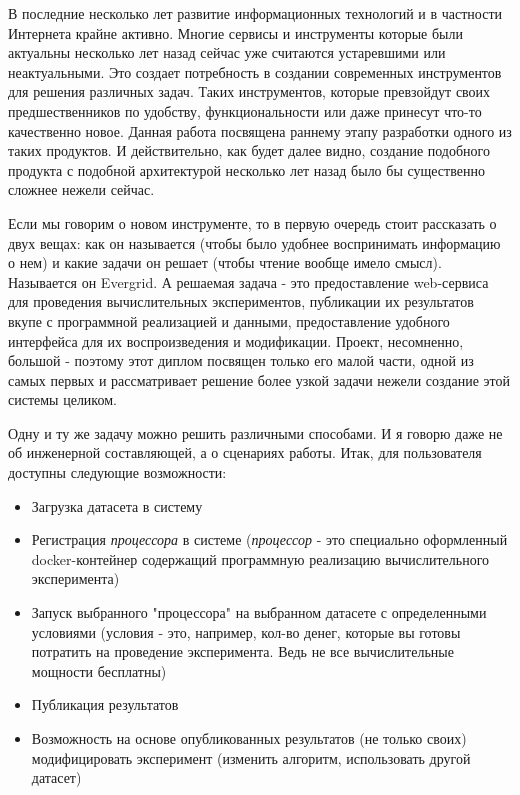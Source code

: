 \intro

В последние несколько лет развитие информационных технологий и в частности Интернета крайне активно. Многие сервисы и инструменты которые были актуальны несколько лет назад сейчас уже считаются устаревшими или неактуальными. Это создает потребность в создании современных инструментов для решения различных задач. Таких инструментов, которые превзойдут своих предшественников по удобству, функциональности или даже принесут что-то качественно новое. Данная работа посвящена раннему этапу разработки одного из таких продуктов. И действительно, как будет далее видно, создание подобного продукта с подобной архитектурой несколько лет назад было бы существенно сложнее нежели сейчас.

Если мы говорим о новом инструменте, то в первую очередь стоит рассказать о двух вещах: как он называется (чтобы было удобнее воспринимать информацию о нем) и какие задачи он решает (чтобы чтение вообще имело смысл). Называется он Evergrid. А решаемая задача - это предоставление web-сервиса для проведения вычислительных экспериментов, публикации их результатов вкупе с программной реализацией и данными, предоставление удобного интерфейса для их воспроизведения и модификации. Проект, несомненно, большой - поэтому этот диплом посвящен только его малой части, одной из самых первых и рассматривает решение более узкой задачи нежели создание этой системы целиком.

Одну и ту же задачу можно решить различными способами. И я говорю даже не об инженерной составляющей, а о сценариях работы. Итак, для пользователя доступны следующие возможности:

\begin{itemize}
	\item Загрузка датасета в систему
	\item Регистрация \textit{процессора} в системе (\textit{процессор} - это специально оформленный docker-контейнер содержащий программную реализацию вычислительного эксперимента)
	\item Запуск выбранного "процессора" на выбранном датасете с определенными условиями (условия - это, например, кол-во денег, которые вы готовы потратить на проведение эксперимента. Ведь не все вычислительные мощности бесплатны)
	\item Публикация результатов
	\item Возможность на основе опубликованных результатов (не только своих) модифицировать эксперимент (изменить алгоритм, использовать другой датасет)
\end{itemize}

